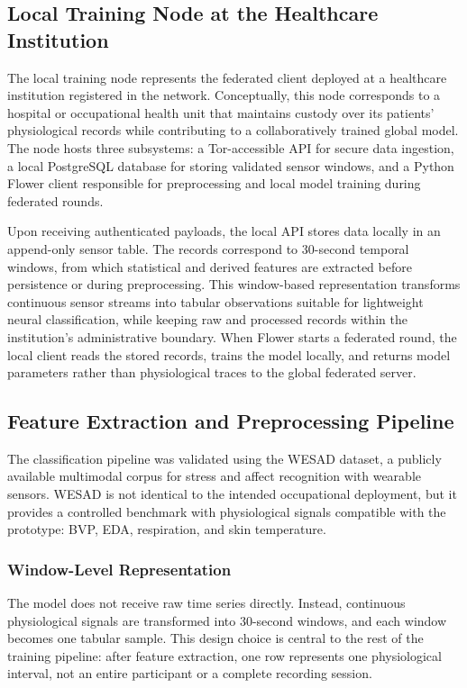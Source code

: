 \documentclass[12pt]{article}
\begin{document}
\subsection{Local Training Node at the Healthcare Institution}

The local training node represents the federated client deployed at a healthcare institution registered in the network. Conceptually, this node corresponds to a hospital or occupational health unit that maintains custody over its patients' physiological records while contributing to a collaboratively trained global model. The node hosts three subsystems: a Tor-accessible API for secure data ingestion, a local PostgreSQL database for storing validated sensor windows, and a Python Flower client responsible for preprocessing and local model training during federated rounds.

Upon receiving authenticated payloads, the local API stores data locally in an append-only sensor table. The records correspond to 30-second temporal windows, from which statistical and derived features are extracted before persistence or during preprocessing. This window-based representation transforms continuous sensor streams into tabular observations suitable for lightweight neural classification, while keeping raw and processed records within the institution's administrative boundary. When Flower starts a federated round, the local client reads the stored records, trains the model locally, and returns model parameters rather than physiological traces to the global federated server.

\subsection{Feature Extraction and Preprocessing Pipeline}

The classification pipeline was validated using the WESAD dataset, a publicly available multimodal corpus for stress and affect recognition with wearable sensors. WESAD is not identical to the intended occupational deployment, but it provides a controlled benchmark with physiological signals compatible with the prototype: BVP, EDA, respiration, and skin temperature.

\subsubsection{Window-Level Representation}

The model does not receive raw time series directly. Instead, continuous physiological signals are transformed into 30-second windows, and each window becomes one tabular sample. This design choice is central to the rest of the training pipeline: after feature extraction, one row represents one physiological interval, not an entire participant or a complete recording session.
\end{document}

